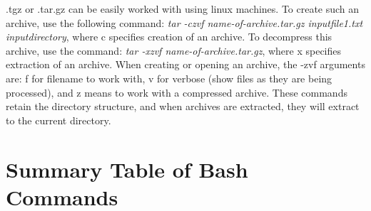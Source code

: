 \documentclass[12pt]{article}
\begin{document}
\quad .tgz or .tar.gz can be easily worked with using linux machines. To create such an archive, use the following command: \textit{tar -czvf name-of-archive.tar.gz inputfile1.txt inputdirectory}, where c specifies creation of an archive. To decompress this archive, use the command: \textit{tar -xzvf name-of-archive.tar.gz}, where x specifies extraction of an archive. When creating or opening an archive, the -zvf arguments are: f for filename to work with, v for verbose (show files as they are being processed), and z means to work with a compressed archive. These commands retain the directory structure, and when archives are extracted, they will extract to the current directory.

\newpage

\section{Summary Table of Bash Commands}
\end{document}
